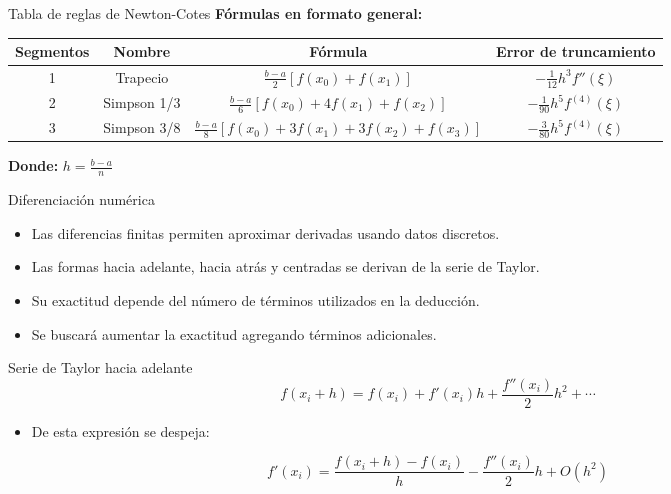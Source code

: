 \documentclass[main.tex]{subfiles}
\begin{document}
\begin{frame}{Tabla de reglas de Newton-Cotes}
\textbf{Fórmulas en formato general:}
\begin{center}
\scriptsize
\begin{tabular}{|c|c|c|c|}
\hline
Segmentos & Nombre & Fórmula & Error de truncamiento \\
\hline
1 & Trapecio & $\frac{b-a}{2}[f(x_0) + f(x_1)]$ & $-\frac{1}{12}h^3f''(\xi)$ \\
2 & Simpson 1/3 & $\frac{b-a}{6}[f(x_0) + 4f(x_1) + f(x_2)]$ & $-\frac{1}{90}h^5f^{(4)}(\xi)$ \\
3 & Simpson 3/8 & $\frac{b-a}{8}[f(x_0) + 3f(x_1) + 3f(x_2) + f(x_3)]$ & $-\frac{3}{80}h^5f^{(4)}(\xi)$ \\
\hline
\end{tabular}
\end{center}
\textbf{Donde:} $h = \frac{b - a}{n}$
\end{frame}



\begin{frame}{Diferenciación numérica}
\begin{itemize}
  \item Las diferencias finitas permiten aproximar derivadas usando datos discretos.
  \item Las formas hacia adelante, hacia atrás y centradas se derivan de la serie de Taylor.
  \item Su exactitud depende del número de términos utilizados en la deducción.
  \item Se buscará aumentar la exactitud agregando términos adicionales.
\end{itemize}
\end{frame}

\begin{frame}{Serie de Taylor hacia adelante}
\begin{equation*}
  f(x_i + h) = f(x_i) + f'(x_i) h + \frac{f''(x_i)}{2} h^2 + \cdots
\end{equation*}
\begin{itemize}
  \item De esta expresión se despeja:
\end{itemize}
\begin{equation*}
  f'(x_i) = \frac{f(x_i + h) - f(x_i)}{h} - \frac{f''(x_i)}{2}h + O(h^2)
\end{equation*}
\end{frame}
\end{document}
